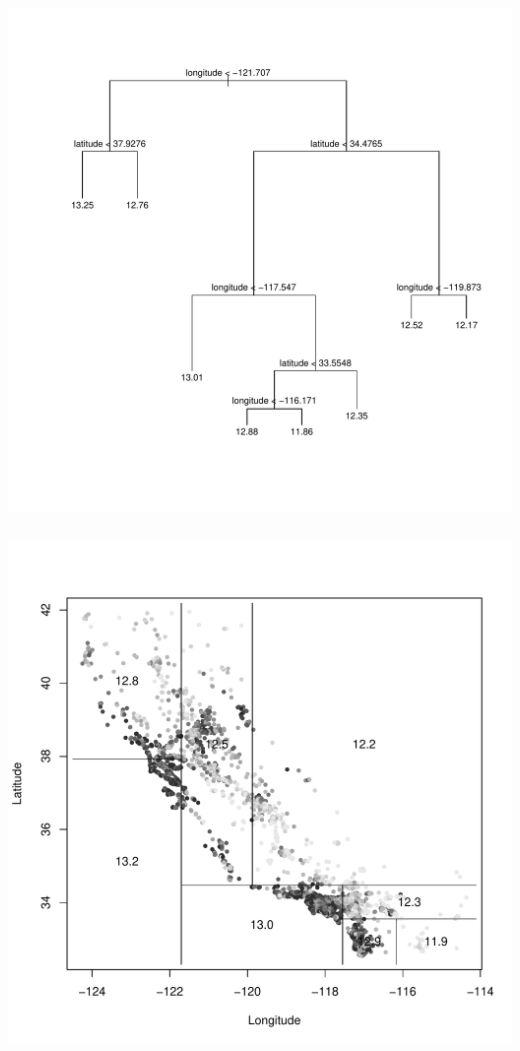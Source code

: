 \documentclass[xetex,mathserif,serif,aspectratio=169]{beamer}
\begin{document}
\begin{frame}[fragile] \frametitle{} \oldB \small

\begin{center}
\includegraphics[height=\textheight]{img/simpleTree.pdf}
\end{center}

\end{frame}

\begin{frame}[fragile] \frametitle{} \oldB \small

\begin{center}
\includegraphics[height=\textheight]{img/simplePartTree.pdf}
\end{center}

\end{frame}
\end{document}
